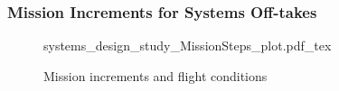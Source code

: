 
\begin{frame}
 \frametitle{Mission Increments for Systems Off-takes}
     \begin{figure}
     \tiny
     \def\svgwidth{7cm}
     {systems_design_study_MissionSteps_plot.pdf_tex}
         \caption{\scriptsize{Mission increments and flight conditions}}
     \end{figure}
\end{frame}

